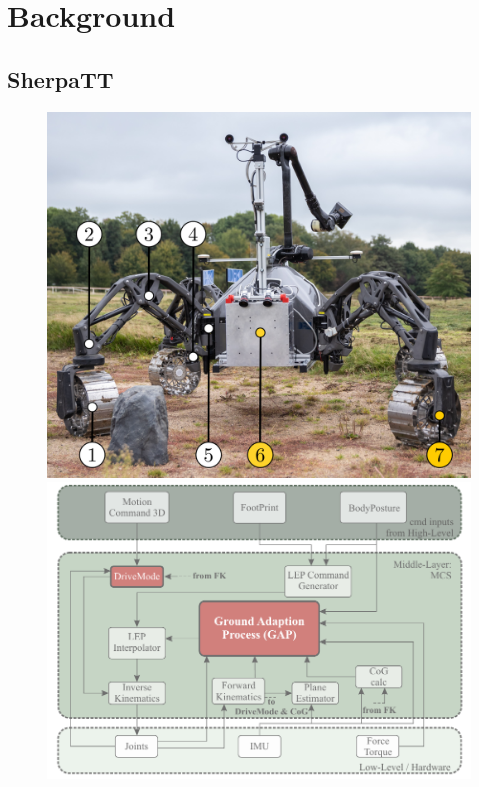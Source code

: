 \section{Background}


\subsection{SherpaTT}

\begin{figure}[!htbp]
       {
           \includegraphics[width=\columnwidth]{../figures/terrain_classifier_sensor_inputs.png}
       }
       {
           \includegraphics[width=\columnwidth]{../figures/MCS-Structure.pdf}
}
\end{figure}
